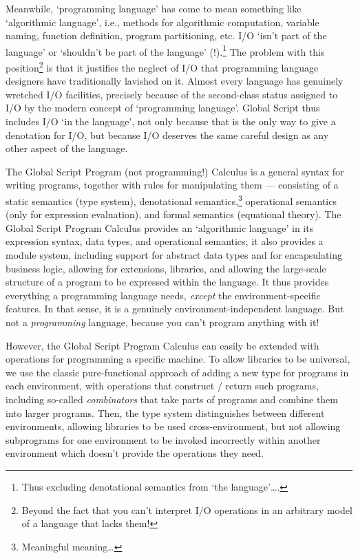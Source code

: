 \documentclass{report}
\begin{document}
Meanwhile, `programming language' has come to mean something like `algorithmic language', i.e.,
methods for algorithmic computation, variable naming, function definition, program partitioning, etc.
I/O `isn't part of the language' or `shouldn't be part of the language' (!).\footnote{Thus excluding denotational semantics from `the language'\ldots.}
The problem with this position\footnote{Beyond the fact that you can't interpret I/O operations in an arbitrary model of a language that lacks them!}
is that it justifies the neglect of I/O that programming language designers have traditionally lavished on it.
Almost every language has genuinely wretched I/O facilities,
precisely because of the second-class status assigned to I/O by the modern concept of `programming language'.
Global Script thus includes I/O `in the language', not only because that is the only way to give a denotation for I/O,
but because I/O deserves the same careful design as any other aspect of the language.

The Global Script Program (not programming!) Calculus is a general syntax for writing programs,
together with rules for manipulating them ---
consisting of a static semantics (type system),
denotational semantics,\footnote{Meaningful meaning\ldots}
operational semantics (only for expression evaluation),
and formal semantics (equational theory).
The Global Script Program Calculus provides an `algorithmic language' in its expression syntax, data types, and operational semantics;
it also provides a module system, including support for abstract data types and for encapsulating business logic,
allowing for extensions, libraries, and allowing the large-scale structure of a program to be expressed within the language.
It thus provides everything a programming language needs, \emph{except} the environment-specific features.
In that sense, it is a genuinely environment-independent language.
But not a \emph{programming} language, because you can't program anything with it!

However, the Global Script Program Calculus can easily be extended with operations for programming a specific machine.
To allow libraries to be universal,
we use the classic pure-functional approach
of adding a new type for programs in each environment,
with operations that construct / return such programs,
including so-called \emph{combinators} that take parts of programs
and combine them into larger programs.
Then, the type system distinguishes between different environments,
allowing libraries to be used cross-environment,
but not allowing subprograms for one environment to be invoked incorrectly within another environment
which doesn't provide the operations they need.
\end{document}
